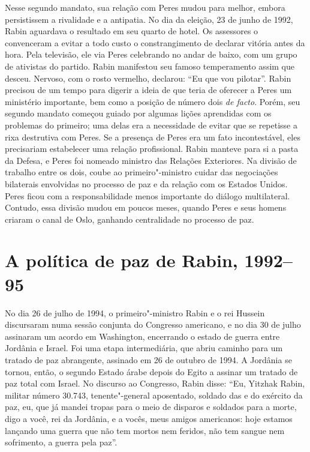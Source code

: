 Nesse segundo mandato, sua relação com Peres mudou para melhor, embora
persistissem a rivalidade e a antipatia. No dia da eleição, 23 de junho
de 1992, Rabin aguardava o resultado em seu quarto de hotel. Os
assessores o convenceram a evitar a todo custo o constrangimento de
declarar vitória antes da hora. Pela televisão, ele via Peres celebrando no
andar de baixo, com um grupo de ativistas do partido. Rabin manifestou
seu famoso temperamento assim que desceu. Nervoso, com o rosto vermelho,
declarou: ``Eu que vou pilotar''. Rabin precisou de um tempo para
digerir a ideia de que teria de oferecer a Peres um ministério
importante, bem como a posição de número dois \emph{de facto}. Porém,
seu segundo mandato começou guiado por algumas lições aprendidas com os
problemas do primeiro; uma delas era a necessidade de evitar que se
repetisse a rixa destrutiva com Peres. Se a presença de Peres era um
fato incontestável, eles precisariam estabelecer uma relação
profissional. Rabin manteve para si a pasta da Defesa, e Peres foi
nomeado ministro das Relações Exteriores. Na divisão de trabalho entre
os dois, coube ao primeiro"-ministro cuidar das negociações bilaterais
envolvidas no processo de paz e da relação com os Estados Unidos. Peres
ficou com a responsabilidade menos importante do diálogo multilateral.
Contudo, essa divisão mudou em poucos meses, quando Peres e seus
homens criaram o canal de Oslo, ganhando centralidade no processo de
paz.

\chapter[A política de paz de Rabin, 1992--95]{A política de paz de Rabin, 1992--95}

No dia 26 de julho de 1994, o primeiro"-ministro Rabin e o rei Hussein
discursaram numa sessão conjunta do Congresso americano, e no dia 30 de
julho assinaram um acordo em Washington, encerrando o estado de guerra
entre Jordânia e Israel. Foi uma etapa intermediária, que abriu caminho
para um tratado de paz abrangente, assinado em 26 de outubro de 1994. A
Jordânia se tornou, então, o segundo Estado árabe depois do Egito a
assinar um tratado de paz total com Israel. No discurso ao Congresso,
Rabin disse: ``Eu, Yitzhak Rabin,  militar número 30.743,
tenente"-general aposentado, soldado das  e do exército da paz, eu,
que já mandei tropas para o meio de disparos e soldados para a morte,
digo a você, rei da Jordânia, e a vocês, meus amigos americanos: hoje
estamos lançando uma guerra que não tem mortos nem feridos, não tem
sangue nem sofrimento, a guerra pela paz''.

